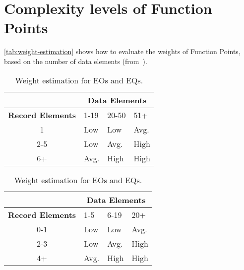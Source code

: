 \section{Complexity levels of Function Points}
\autoref{tab:weight-estimation} shows how to evaluate the weights of Function Points, based on the number of data elements (from~\cite{cocomo-manual}).

\begin{table}[h]
\centering
\begin{subtable}{\textwidth}
    \centering
    \begin{tabular}{| c | l | l | l |}
        \hline
         & \multicolumn{3}{c|}{\textbf{Data Elements}} \\
        \hline
        \textbf{Record Elements} & 1-19 & 20-50 & 51+ \\
        \hline
        1       & Low     & Low     & Avg.     \\
        2-5     & Low     & Avg.    & High     \\
        6+      & Avg.    & High    & High     \\
        \hline
    \end{tabular}
    \caption{Weight estimation for ILFs and EIFs.}
\end{subtable}

\vspace{2em}

\begin{subtable}{\textwidth}
    \centering
    \begin{tabular}{| c | l | l | l |}
        \hline
         & \multicolumn{3}{c|}{\textbf{Data Elements}} \\
        \hline
        \textbf{Record Elements} & 1-5 & 6-19 & 20+ \\
        \hline
        0-1     & Low     & Low     & Avg.     \\
        2-3     & Low     & Avg.    & High     \\
        4+      & Avg.    & High    & High     \\
        \hline
    \end{tabular}
    \caption{Weight estimation for EOs and EQs.}
\end{subtable}

\vspace{2em}


\end{table}
